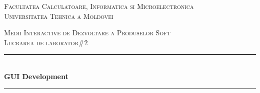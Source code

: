 \documentclass[12pt,a4paper,titlepage]{article}
\begin{document}
\begin{titlepage}

  \begin{center} %

  \textsc{\large Facultatea Calculatoare, Informatica si Microelectronica}\\[0.5cm]
  \textsc{\large Universitatea Tehnica a Moldovei}\\[1.2cm] %
  \vspace{25 mm}

  \textsc{\Large Medii Interactive de Dezvoltare a Produselor Soft}\\[0.5cm] %
  \textsc{\large Lucrarea de laborator\#2}\\[0.5cm] %

\newcommand{\HRule}{\rule{\linewidth}{0.5mm}} %

  \vspace{10 mm}
  \HRule \\[0.4cm]
  { \LARGE \bfseries GUI Development }\\[0.4cm] %
  \HRule \\[1.5cm]

      \vspace{30mm}


\end{center}
\end{titlepage}
\end{document}
